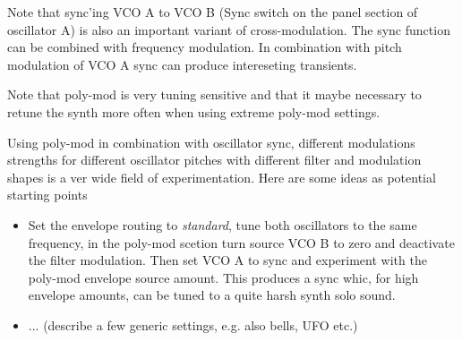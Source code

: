 
Note that sync'ing VCO A to VCO B (Sync switch on the panel section of oscillator A) is also an important variant of cross-modulation. The sync function can be combined with frequency modulation. In combination with pitch modulation of VCO A sync can produce intereseting transients.  

Note that poly-mod is very tuning sensitive and that it maybe necessary to retune the synth more often when using extreme poly-mod settings.

Using poly-mod in combination with oscillator sync, different modulations strengths for different oscillator pitches with different filter and modulation shapes is a ver wide field of experimentation. Here are some ideas as potential starting points

\begin{itemize}
  \item Set the envelope routing to \textit{standard}, tune both oscillators to the same frequency, in the poly-mod scetion turn source VCO B to zero and deactivate the filter modulation. Then set VCO A to sync and experiment with the poly-mod envelope source amount. This produces a sync whic, for high envelope amounts, can be tuned to a quite harsh synth solo sound.
  \item ... (describe a few generic settings, e.g. also bells, UFO etc.)
\end{itemize} 
